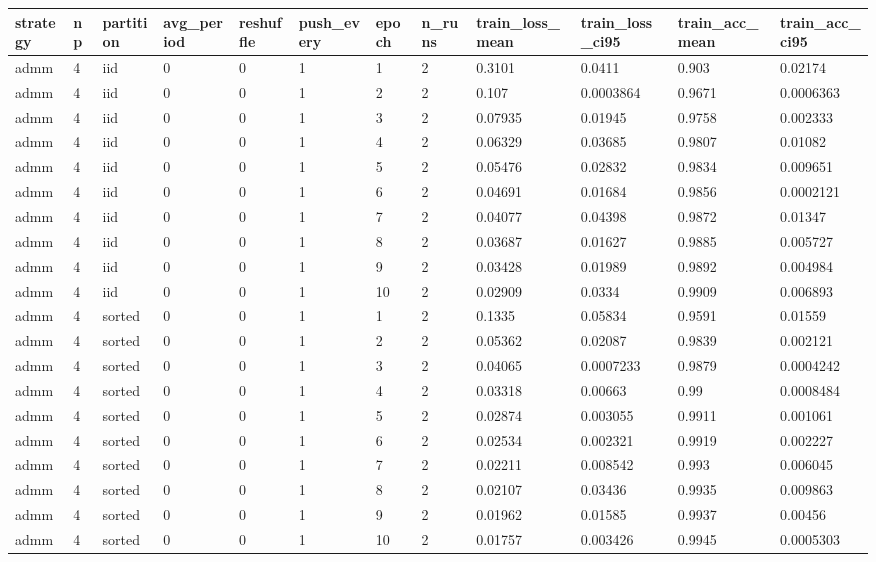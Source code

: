 \begin{tabular}{llllllllllll}
\hline
strategy & np & partition & avg\_period & reshuffle & push\_every & epoch & n\_runs & train\_loss\_mean & train\_loss\_ci95 & train\_acc\_mean & train\_acc\_ci95 \\
\hline
admm & 4 & iid & 0 & 0 & 1 & 1 & 2 & 0.3101 & 0.0411 & 0.903 & 0.02174 \\
admm & 4 & iid & 0 & 0 & 1 & 2 & 2 & 0.107 & 0.0003864 & 0.9671 & 0.0006363 \\
admm & 4 & iid & 0 & 0 & 1 & 3 & 2 & 0.07935 & 0.01945 & 0.9758 & 0.002333 \\
admm & 4 & iid & 0 & 0 & 1 & 4 & 2 & 0.06329 & 0.03685 & 0.9807 & 0.01082 \\
admm & 4 & iid & 0 & 0 & 1 & 5 & 2 & 0.05476 & 0.02832 & 0.9834 & 0.009651 \\
admm & 4 & iid & 0 & 0 & 1 & 6 & 2 & 0.04691 & 0.01684 & 0.9856 & 0.0002121 \\
admm & 4 & iid & 0 & 0 & 1 & 7 & 2 & 0.04077 & 0.04398 & 0.9872 & 0.01347 \\
admm & 4 & iid & 0 & 0 & 1 & 8 & 2 & 0.03687 & 0.01627 & 0.9885 & 0.005727 \\
admm & 4 & iid & 0 & 0 & 1 & 9 & 2 & 0.03428 & 0.01989 & 0.9892 & 0.004984 \\
admm & 4 & iid & 0 & 0 & 1 & 10 & 2 & 0.02909 & 0.0334 & 0.9909 & 0.006893 \\
admm & 4 & sorted & 0 & 0 & 1 & 1 & 2 & 0.1335 & 0.05834 & 0.9591 & 0.01559 \\
admm & 4 & sorted & 0 & 0 & 1 & 2 & 2 & 0.05362 & 0.02087 & 0.9839 & 0.002121 \\
admm & 4 & sorted & 0 & 0 & 1 & 3 & 2 & 0.04065 & 0.0007233 & 0.9879 & 0.0004242 \\
admm & 4 & sorted & 0 & 0 & 1 & 4 & 2 & 0.03318 & 0.00663 & 0.99 & 0.0008484 \\
admm & 4 & sorted & 0 & 0 & 1 & 5 & 2 & 0.02874 & 0.003055 & 0.9911 & 0.001061 \\
admm & 4 & sorted & 0 & 0 & 1 & 6 & 2 & 0.02534 & 0.002321 & 0.9919 & 0.002227 \\
admm & 4 & sorted & 0 & 0 & 1 & 7 & 2 & 0.02211 & 0.008542 & 0.993 & 0.006045 \\
admm & 4 & sorted & 0 & 0 & 1 & 8 & 2 & 0.02107 & 0.03436 & 0.9935 & 0.009863 \\
admm & 4 & sorted & 0 & 0 & 1 & 9 & 2 & 0.01962 & 0.01585 & 0.9937 & 0.00456 \\
admm & 4 & sorted & 0 & 0 & 1 & 10 & 2 & 0.01757 & 0.003426 & 0.9945 & 0.0005303 \\

\end{tabular}
